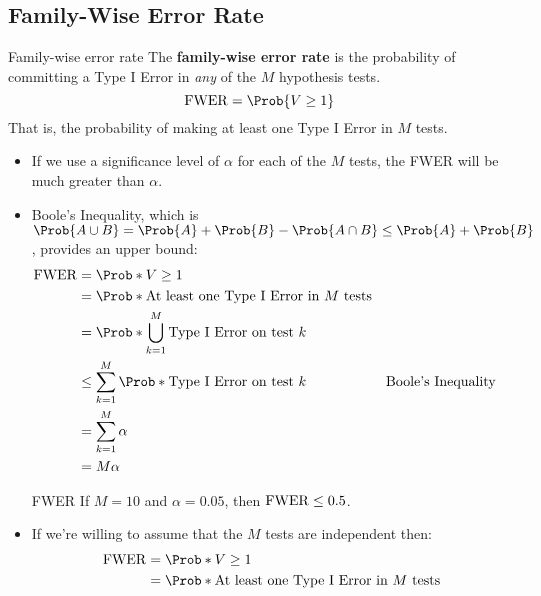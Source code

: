 \subsection{Family-Wise Error Rate}
\begin{Definition}{Family-wise error rate}{}
    The \textbf{family-wise error rate} is the probability of committing a Type I Error in \emph{any} of the
    $M$ hypothesis tests.
    \[ \FWER=\Prob{V\ge 1} \]
    That is, the probability of making at least one Type I Error in $ M $ tests.
\end{Definition}
\begin{itemize}
    \item If we use a significance level of $ \alpha $ for each of the $ M $ tests, the FWER will be much greater
          than $ \alpha $.
    \item Boole's Inequality, which is $ \Prob{A\cup B}=\Prob{A}+\Prob{B}-\Prob{A\cap B}\le \Prob{A}+\Prob{B} $, provides an upper bound:
          \begin{align*}
              \FWER
               & =\Prob*{V\ge 1}                                                                             \\
               & =\Prob*{\text{At least one Type I Error in $ M $ tests}}                                    \\
               & =\Prob*{\bigcup_{k=1}^M \text{Type I Error on test $ k $}}                                  \\
               & \le \sum_{k=1}^{M} \Prob*{\text{Type I Error on test $ k $}} &  & \text{Boole's Inequality} \\
               & =\sum_{k=1}^{M} \alpha                                                                      \\
               & =M\alpha
          \end{align*}
          \begin{Example}{FWER}{}
              If $ M=10 $ and $ \alpha=0.05 $, then $ \operatorname{FWER}\le 0.5 $.
          \end{Example}
    \item If we're willing to assume that the $M$ tests are independent then:
          \begin{align*}
              \FWER
               & =\Prob*{V\ge 1}                                                                            \\
               & =\Prob*{\text{At least one Type I Error in $ M $ tests}}                                   \\

\end{align*}
\end{itemize}
